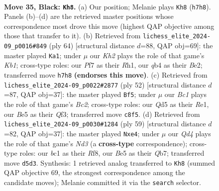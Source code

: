 \documentclass[11pt]{article}
\begin{document}
\clearpage

\begin{figure}[p]\centering
\begin{subfigure}{0.46\textwidth}\centering
\resizebox{\linewidth}{!}{%
\newchessgame
\chessboard[
  setfen={r1b5/ppp2ppk/5n1p/3qb3/1Q6/5P1P/PPB3P1/R1B4K b - - 11 35},
  showmover=false,
  pgfstyle=straightmove, color=movearrow, markmove={h7-h8}
]}
\caption{}
\end{subfigure}\hfill
\begin{subfigure}{0.46\textwidth}\centering
\resizebox{\linewidth}{!}{%
\newchessgame
\chessboard[
  setfen={6k1/4brp1/3p3p/n4b2/p2B3P/Pq2P1Q1/1P1NB1P1/1K5R w - - 7 33},
  showmover=false,
  pgfstyle=straightmove, color=movearrow, markmove={b1-a1}
]}
\caption{}
\end{subfigure}
\\[4pt]
\begin{subfigure}{0.46\textwidth}\centering
\resizebox{\linewidth}{!}{%
\newchessgame
\chessboard[
  setfen={2r2k1r/1p3ppp/2b4q/p2pB3/6P1/P1N2Q2/1PB2P1P/4R1K1 w - - 1 27},
  showmover=false,
  pgfstyle=straightmove, color=movearrow, markmove={c2-f5}
]}
\caption{}
\end{subfigure}\hfill
\begin{subfigure}{0.46\textwidth}\centering
\resizebox{\linewidth}{!}{%
\newchessgame
\chessboard[
  setfen={5r2/1q1kbp2/p2np1p1/1p4P1/3PPB2/1B5Q/P4PK1/4R3 b - - 7 30},
  showmover=false,
  pgfstyle=straightmove, color=movearrow, markmove={d6-e4}
]}
\caption{}
\end{subfigure}
\caption{\textbf{Move 35, Black: \texttt{Kh8}.} (a) Our position; Melanie plays \texttt{Kh8} (\texttt{h7h8}). Panels (b)--(d) are the retrieved master positions whose correspondence most drove this move (highest QAP objective among those that transfer to it). (b) Retrieved from \texttt{lichess\_elite\_2024-09\_p0016\#849} (ply 64) [structural distance $d$=88, QAP obj=69]: the master played \texttt{Ka1}; under $\mu$ our \emph{Kh2} plays the role of that game's \emph{Kb1}; cross-type roles: our \emph{P}f7 as their \emph{R}h1, our \emph{q}b4 as their \emph{B}e2; transferred move \texttt{h7h8} \textbf{(endorses this move)}. (c) Retrieved from \texttt{lichess\_elite\_2024-09\_p0022\#2877} (ply 52) [structural distance $d$=87, QAP obj=37]: the master played \texttt{Bf5}; under $\mu$ our \emph{Bc1} plays the role of that game's \emph{Bc2}; cross-type roles: our \emph{Q}d5 as their \emph{R}e1, our \emph{B}e5 as their \emph{Q}f3; transferred move \texttt{c8f5}. (d) Retrieved from \texttt{lichess\_elite\_2024-09\_p0030\#1284} (ply 59) [structural distance $d$=82, QAP obj=37]: the master played \texttt{Nxe4}; under $\mu$ our \emph{Qd4} plays the role of that game's \emph{Nd3} (a \textbf{cross-type} correspondence); cross-type roles: our \emph{b}c1 as their \emph{R}f8, our \emph{B}e5 as their \emph{Q}b7; transferred move \texttt{d5d3}. Synthesis: 1 retrieved analog transferred to \texttt{Kh8} (summed QAP objective 69, the strongest correspondence among the candidate moves); Melanie committed it via the \texttt{search} selector.}
\label{fig:thought-m69}
\end{figure}
\end{document}

